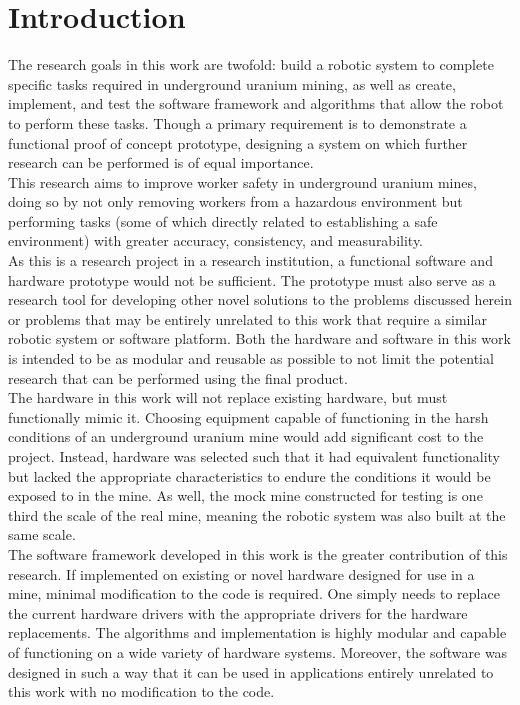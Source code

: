 \chapter{Introduction}
\label{chap:introduction}

The research goals in this work are twofold: build a robotic system to complete specific tasks required in underground uranium mining, as well as create, implement, and test the software framework and algorithms that allow the robot to perform these tasks. Though a primary requirement is to demonstrate a functional proof of concept prototype, designing a system on which further research can be performed is of equal importance.\\

This research aims to improve worker safety in underground uranium mines, doing so by not only removing workers from a hazardous environment but performing tasks (some of which directly related to establishing a safe environment) with greater accuracy, consistency, and measurability.\\

As this is a research project in a research institution, a functional software and hardware prototype would not be sufficient. The prototype must also serve as a research tool for developing other novel solutions to the problems discussed herein or problems that may be entirely unrelated to this work that require a similar robotic system or software platform. Both the hardware and software in this work is intended to be as modular and reusable as possible to not limit the potential research that can be performed using the final product.\\

The hardware in this work will not replace existing hardware, but must functionally mimic it. Choosing equipment capable of functioning in the harsh conditions of an underground uranium mine would add significant cost to the project. Instead, hardware was selected such that it had equivalent functionality but lacked the appropriate characteristics to endure the conditions it would be exposed to in the mine. As well, the mock mine constructed for testing is one third the scale of the real mine, meaning the robotic system was also built at the same scale.\\

The software framework developed in this work is the greater contribution of this research. If implemented on existing or novel hardware designed for use in a mine, minimal modification to the code is required. One simply needs to replace the current hardware drivers with the appropriate drivers for the hardware replacements. The algorithms and implementation is highly modular and capable of functioning on a wide variety of hardware systems. Moreover, the software was designed in such a way that it can be used in applications entirely unrelated to this work with no modification to the code.\\

